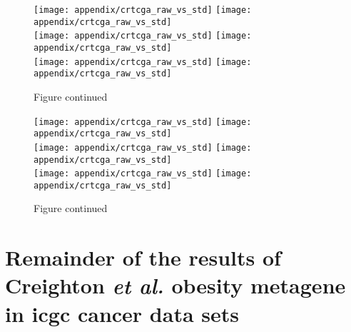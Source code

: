 \begin{appendices}
	\begin{figure}[htpb]
		\ContinuedFloat
		\captionsetup{list=off,format=cont}
		\centering
		\texttt{[image: appendix/crtcga\_raw\_vs\_std]}
		\hfill
		\texttt{[image: appendix/crtcga\_raw\_vs\_std]}\\
		\texttt{[image: appendix/crtcga\_raw\_vs\_std]}
		\hfill
		\texttt{[image: appendix/crtcga\_raw\_vs\_std]}\\
		\texttt{[image: appendix/crtcga\_raw\_vs\_std]}
		\hfill
		\texttt{[image: appendix/crtcga\_raw\_vs\_std]}\\
		\caption{Figure continued}
	\end{figure}

	\begin{figure}[htpb]
		\ContinuedFloat
		\captionsetup{list=off,format=cont}
		\centering
		\texttt{[image: appendix/crtcga\_raw\_vs\_std]}
		\hfill
		\texttt{[image: appendix/crtcga\_raw\_vs\_std]}\\
		\texttt{[image: appendix/crtcga\_raw\_vs\_std]}
		\hfill
		\texttt{[image: appendix/crtcga\_raw\_vs\_std]}\\
		\texttt{[image: appendix/crtcga\_raw\_vs\_std]}
		\hfill
		\texttt{[image: appendix/crtcga\_raw\_vs\_std]}\\
		\caption{Figure continued}
	\end{figure}

	\section{Remainder of the results of Creighton \textit{et al.} obesity metagene in \gls{icgc} cancer data sets}
	\label{sec:rest_of_the_cr_icgc_cancer_heatmap_results}


\end{appendices}
